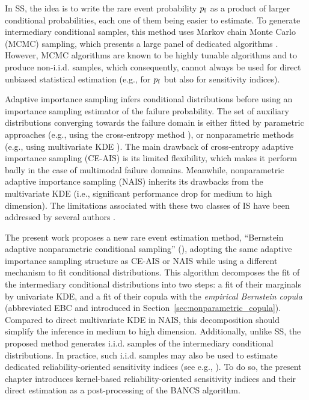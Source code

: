 In SS, the idea is to write the rare event probability $p_\mathrm{f}$ as a product of larger conditional probabilities, each one of them being easier to estimate. 
To generate intermediary conditional samples, this method uses Markov chain Monte Carlo (MCMC) sampling, which presents a large panel of dedicated algorithms \citep{Papaioannou_PEM_2015}. 
However, MCMC algorithms are known to be highly tunable algorithms and to produce non-i.i.d. samples, which consequently, cannot always be used for direct unbiased statistical estimation (e.g., for $p_\mathrm{f}$ but also for sensitivity indices). 

Adaptive importance sampling infers conditional distributions before using an importance sampling estimator of the failure probability. 
The set of auxiliary distributions converging towards the failure domain is either fitted by parametric approaches (e.g., using the cross-entropy method \citealp{rubinstein_2004_CE}), or nonparametric methods (e.g., using multivariate KDE \citealp{zhang_1996_NIS, Morio_RESS_2011}). 
The main drawback of cross-entropy adaptive importance sampling (CE-AIS) is its limited flexibility, which makes it perform badly in the case of multimodal failure domains. 
Meanwhile, nonparametric adaptive importance sampling (NAIS) inherits its drawbacks from the multivariate KDE (i.e., significant performance drop for medium to high dimension). 
The limitations associated with these two classes of IS have been addressed by several authors \citep{kurtz_song_2013_aisce,papaioannou_2016, geyer_2019_aisce, uribe_2021_aisce}.

The present work proposes a new rare event estimation method, ``Bernstein adaptive nonparametric conditional sampling'' (), adopting the same adaptive importance sampling structure as CE-AIS or NAIS while using a different mechanism to fit conditional distributions. 
This algorithm decomposes the fit of the intermediary conditional distributions into two steps: a fit of their marginals by univariate KDE, and a fit of their copula with the \emph{empirical Bernstein copula} (abbreviated EBC and introduced in Section~\ref{sec:nonparametric_copula}). 
Compared to direct multivariate KDE in NAIS, this decomposition should simplify the inference in medium to high dimension. 
Additionally, unlike SS, the proposed method generates i.i.d. samples of the intermediary conditional distributions. 
In practice, such i.i.d. samples may also be used to estimate dedicated reliability-oriented sensitivity indices (see e.g., \citealp{chabridon2021global,marrel_chabridon_2021}). 
To do so, the present chapter introduces kernel-based reliability-oriented sensitivity indices and their direct estimation as a post-processing of the BANCS algorithm. 

